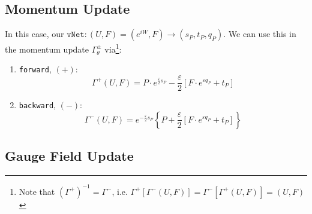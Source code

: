 \documentclass[a4paper,11pt]{article}
\begin{document}
\subsection{\label{sec:momentum-update}Momentum Update}
%
In this case, our $\texttt{vNet}: (U, F) = (e^{iW}, F) \rightarrow (s_{P},
t_{P}, q_{P})$.
%
We can use this in the momentum update $\Gamma^{\pm}_{\theta}$
via\footnote{Note that $\left(\Gamma^{+}\right)^{-1} = \Gamma^{-}$, i.e.
$\Gamma^{+}\left[\Gamma^{-}(U, F)\right] = \Gamma^{-}\left[\Gamma^{+}(U,
F)\right] = (U, F)$}:
%
\begin{enumerate}
    \item \texttt{forward}, $(+)$:
    \begin{equation}
        \Gamma^{+}(U, F) = P \cdot e^{\frac{\varepsilon}{2} s_{P}} - \frac{\varepsilon}{2}\left[ F \cdot e^{\varepsilon q_{P}} + t_{P} \right]
    \end{equation}
    \item \texttt{backward}, $(-)$:
    \begin{equation}
        \Gamma^{-}(U, F) = e^{-\frac{\varepsilon}{2} s_{P}} \left\{P + \frac{\varepsilon}{2} \left[ F \cdot e^{\varepsilon q_{P}} + t_{P} \right] \right\}
    \end{equation}
\end{enumerate}
%
\subsection{\label{subsec:gauge-update}Gauge Field Update}
%
\end{document}
